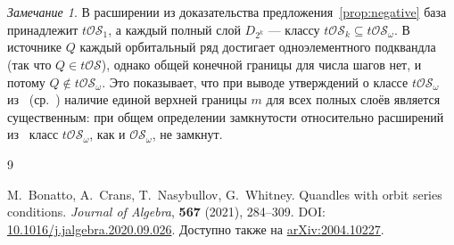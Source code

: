 \documentclass[11pt,a4paper]{article}
\theoremstyle{remark}
\newtheorem{remark}[theorem]{Замечание}
\newcommand{\OS}{\mathcal{OS}}
\newcommand{\tOS}{t\mathcal{OS}}
\begin{document}
\begin{remark}
В расширении из доказательства предложения~\ref{prop:negative} база
принадлежит \(\tOS_1\), а каждый полный слой \(D_{2^k}\) --- классу
\(\tOS_k\subseteq\tOS_\omega\). В источнике \(Q\) каждый орбитальный
ряд достигает одноэлементного подквандла (так что \(Q\in\tOS\)), однако
общей конечной границы для числа шагов нет, и потому \(Q\notin\tOS_\omega\).
Это показывает, что при выводе утверждений о классе \(\tOS_\omega\)
из~\cite[лемма~5.5]{BCNW} (ср.~\cite[следствие~5.6]{BCNW}) наличие
единой верхней границы \(m\) для всех полных слоёв является существенным:
при общем определении замкнутости относительно расширений
из~\cite[раздел~2.2]{BCNW} класс \(\tOS_\omega\), как и \(\OS_\omega\),
не замкнут.
\end{remark}

\begin{thebibliography}{9}
\raggedright
{}
M.~Bonatto, A.~Crans, T.~Nasybullov, G.~Whitney.
\newblock Quandles with orbit series conditions.
\newblock \emph{Journal of Algebra}, \textbf{567} (2021), 284--309.
\newblock DOI:
\href{https://doi.org/10.1016/j.jalgebra.2020.09.026}{10.1016/j.jalgebra.2020.09.026}.
\newblock Доступно также на
\href{https://arxiv.org/abs/2004.10227}{arXiv:2004.10227}.
\end{thebibliography}
\end{document}
